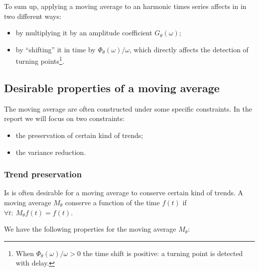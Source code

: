 \documentclass[
  12pt,
  ,
  a4paper]{article}
\newcommand\1{\mathds{1}}
\begin{document}
To sum up, applying a moving average to an harmonic times series affects in in two different ways:

\begin{itemize}
\item
  by multiplying it by an amplitude coefficient \(G_{\theta}\left(\omega\right)\);
\item
  by ``shifting'' it in time by \(\Phi_\theta(\omega)/\omega\), which directly affects the detection of turning points\footnote{When \(\Phi_\theta(\omega)/\omega>0\) the time shift is positive: a turning point is detected with delay.}.
\end{itemize}

\hypertarget{desirable-properties-of-a-moving-average}{%
\subsection{Desirable properties of a moving average}\label{desirable-properties-of-a-moving-average}}

The moving average are often constructed under some specific constraints.
In the report we will focus on two constraints:

\begin{itemize}
\item
  the preservation of certain kind of trends;
\item
  the variance reduction.
\end{itemize}

\hypertarget{trend-preservation}{%
\subsubsection{Trend preservation}\label{trend-preservation}}

Is is often desirable for a moving average to conserve certain kind of trends.
A moving average \(M_\theta\) conserve a function of the time \(f(t)\) if \(\forall t:\:M_\theta f(t)=f(t)\).

We have the following properties for the moving average \(M_\theta\):
\end{document}
